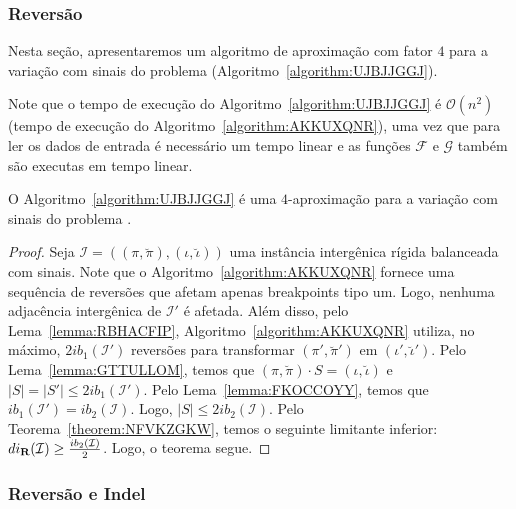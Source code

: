 \subsubsection{Reversão}

Nesta seção, apresentaremos um algoritmo de aproximação com fator $4$ para a variação com sinais do problema \SbIR{} (Algoritmo~\ref{algorithm:UJBJJGGJ}).



Note que o tempo de execução do Algoritmo~\ref{algorithm:UJBJJGGJ} é $\mathcal{O}(n^2)$ (tempo de execução do Algoritmo~\ref{algorithm:AKKUXQNR}), uma vez que para ler os dados de entrada é necessário um tempo linear e as funções $\mathcal{F}$ e $\mathcal{G}$ também são executas em tempo linear.

\begin{theorem}\label{theorem:DGTASCUU}
O Algoritmo~\ref{algorithm:UJBJJGGJ} é uma $4$-aproximação para a variação com sinais do problema \SbIR{}.
\end{theorem}
\begin{proof}
Seja $\mathcal{I} = ((\pi,\breve\pi),(\iota,\breve\iota))$ uma instância intergênica rígida balanceada com sinais. Note que o Algoritmo~\ref{algorithm:AKKUXQNR} fornece uma sequência de reversões que afetam apenas breakpoints tipo um. Logo, nenhuma adjacência intergênica de $\mathcal{I'}$ é afetada. Além disso, pelo Lema~\ref{lemma:RBHACFIP}, Algoritmo~\ref{algorithm:AKKUXQNR} utiliza, no máximo, $2ib_1(\mathcal{I'})$ reversões para transformar $(\pi',\breve\pi')$ em $(\iota',\breve\iota')$. Pelo Lema~\ref{lemma:GTTULLOM}, temos que $(\pi,\breve\pi) \cdot S = (\iota,\breve\iota)$ e $|S| = |S'| \le 2ib_1(\mathcal{I'})$. Pelo Lema~\ref{lemma:FKOCCOYY}, temos que $ib_1(\mathcal{I'}) = ib_2(\mathcal{I})$. Logo, $|S| \le 2ib_2(\mathcal{I})$. Pelo Teorema~\ref{theorem:NFVKZGKW}, temos o seguinte limitante inferior: $di_{\textbf{R}}(\mathcal{I}) \ge \frac{ib_2(\mathcal{I})}{2}$. Logo, o teorema segue.
\end{proof}

\subsubsection{Reversão e Indel}

